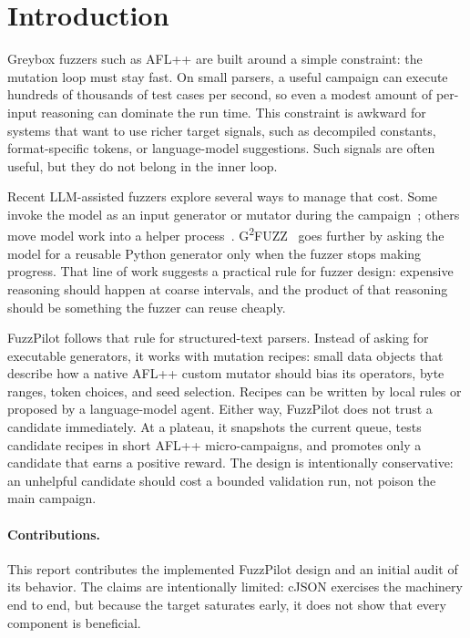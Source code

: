 \documentclass[11pt]{article}
\begin{document}
\section{Introduction}
\label{sec:intro}

Greybox fuzzers such as AFL++ are built around a simple constraint:
the mutation loop must stay fast. On small parsers, a useful campaign
can execute hundreds of thousands of test cases per second, so even a
modest amount of per-input reasoning can dominate the run time. This
constraint is awkward for systems that want to use richer target
signals, such as decompiled constants, format-specific tokens, or
language-model suggestions. Such signals are often useful, but they do
not belong in the inner loop.

Recent LLM-assisted fuzzers explore several ways to manage that cost.
Some invoke the model as an input generator or mutator during the
campaign~\cite{wang2024llamafuzz,liu2024fuzzcoder,xia2024fuzz4all};
others move model work into a helper process~\cite{lin2025hybrid}.
G\textsuperscript{2}FUZZ~\cite{liu2025g2fuzz} goes further by asking
the model for a reusable Python generator only when the fuzzer stops
making progress. That line of work suggests a practical rule for
fuzzer design: expensive reasoning should happen at coarse intervals,
and the product of that reasoning should be something the fuzzer can
reuse cheaply.

FuzzPilot follows that rule for structured-text parsers. Instead of
asking for executable generators, it works with mutation recipes:
small data objects that describe how a native AFL++ custom mutator
should bias its operators, byte ranges, token choices, and seed
selection. Recipes can be written by local rules or proposed by a
language-model agent. Either way, FuzzPilot does not trust a candidate
immediately. At a plateau, it snapshots the current queue, tests
candidate recipes in short AFL++ micro-campaigns, and promotes only a
candidate that earns a positive reward. The design is intentionally
conservative: an unhelpful candidate should cost a bounded validation
run, not poison the main campaign.

\paragraph{Contributions.} This report contributes the implemented
FuzzPilot design and an initial audit of its behavior. The claims are
intentionally limited: cJSON exercises the machinery end to end, but
because the target saturates early, it does not show that every
component is beneficial.
\end{document}
